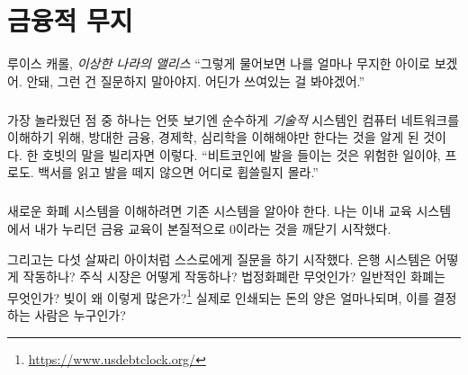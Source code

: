 \chapter{금융적 무지}
\label{les:8}

\begin{chapquote}{루이스 캐롤, \textit{이상한 나라의 앨리스}}
	\enquote{그렇게 물어보면 나를 얼마나 무지한 아이로 보겠어. 안돼, 그런 건 질문하지 말아야지. 어딘가 쓰여있는 걸 봐야겠어.}
\end{chapquote}

\paragraph{}
가장 놀라웠던 점 중 하나는 언뜻 보기엔 순수하게 \textit{기술적} 시스템인 컴퓨터 네트워크를 이해하기 위해, 
방대한 금융, 경제학, 심리학을 이해해야만 한다는 것을 알게 된 것이다.
한 호빗의 말을 빌리자면 이렇다. 
\enquote{비트코인에 발을 들이는 것은 위험한 일이야, 프로도. 백서를 읽고 발을 떼지 않으면 어디로 휩쓸릴지 몰라.}

\paragraph{}
새로운 화폐 시스템을 이해하려면 기존 시스템을 알아야 한다.  
나는 이내 교육 시스템에서 내가 누리던 금융 교육이 본질적으로 0이라는 것을 깨닫기 시작했다. 


그리고는 다섯 살짜리 아이처럼 스스로에게 질문을 하기 시작했다. 
은행 시스템은 어떻게 작동하나? 주식 시장은 어떻게 작동하나? 
법정화폐란 무엇인가? 일반적인 화폐는 무엇인가? 빚이 왜 이렇게 많은가?\footnote{\url{https://www.usdebtclock.org/}} 
실제로 인쇄되는 돈의 양은 얼마나되며, 이를 결정하는 사람은 누구인가?

